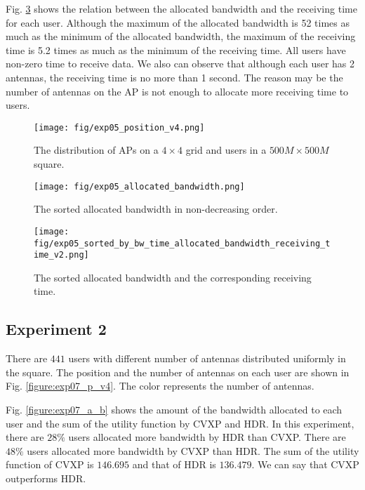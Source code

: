 	Fig. \ref{figure:exp05_s_b_b_t_a_b_r_t_v2} shows the relation between the allocated bandwidth and the receiving time for each user. Although the maximum of the allocated bandwidth is 52 times as much as the minimum of the allocated bandwidth, the maximum of the receiving time is 5.2 times as much as the minimum of the receiving time. All users have non-zero time to receive data. We also can observe that although each user has 2 antennas, the receiving time is no more than 1 second. The reason may be the number of antennas on the AP is not enough to allocate more receiving time to users.

		\begin{figure}
			\begin{center}
				\texttt{[image: fig/exp05\_position\_v4.png]}
				\caption{The distribution of APs on a $4 \times 4$ grid and users in a $500M \times 500M$ square.}
				\label{figure:exp05_p_v4}
			\end{center}
		\end{figure}

		\begin{figure}
			\begin{center}
				\texttt{[image: fig/exp05\_allocated\_bandwidth.png]}
				\caption{The sorted allocated bandwidth in non-decreasing order.}
				\label{figure:exp05_a_b}
			\end{center}
		\end{figure}

		\begin{figure}
			\begin{center}
				\texttt{[image: fig/exp05\_sorted\_by\_bw\_time\_allocated\_bandwidth\_receiving\_time\_v2.png]}
				\caption{The sorted allocated bandwidth and the corresponding receiving time.}
				\label{figure:exp05_s_b_b_t_a_b_r_t_v2}
			\end{center}
		\end{figure}

\subsection{Experiment 2}
	There are $441$ users with different number of antennas distributed uniformly in the square. The position and the number of antennas on each user are shown in Fig. \ref{figure:exp07_p_v4}. The color represents the number of antennas. 
			
	Fig. \ref{figure:exp07_a_b} shows the amount of the bandwidth allocated to each user and the sum of the utility function by CVXP and HDR. In this experiment, there are $28\%$ users allocated more bandwidth by HDR than CVXP. There are $48\%$ users allocated more bandwidth by CVXP than HDR. The sum of the utility function of CVXP is $146.695$ and that of HDR is $136.479$. We can say that CVXP outperforms HDR.


